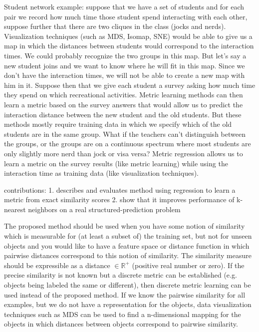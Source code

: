 \documentclass[a4paper,titlepage]{article}
\begin{document}


Student network example: suppose that we have a set of students and for each pair we record how much time those student spend interacting with each other, suppose further that there are two cliques in the class (jocks and nerds). Visualization techniques (such as MDS, Isomap, SNE) would be able to give us a map in which the distances between students would correspond to the interaction times. We could probably recognize the two groups in this map. But let's say a new student joins and we want to know where he will fit in this map. Since we don't have the interaction times, we will not be able to create a new map with him in it. Suppose then that we give each student a survey asking how much time they spend on which recreational activities. Metric learning methods can then learn a metric based on the survey answers that would allow us to predict the interaction distance between the new student and the old students. But these methods mostly require training data in which we specify which of the old students are in the same group. What if the teachers can't distinguish between the groups, or the groups are on a continuous spectrum where most students are only slightly more nerd than jock or visa versa? Metric regression allows us to learn a metric on the survey results (like metric learning) while using the interaction time as training data (like visualization techniques).

contributions: 
1. describes and evaluates method using regression to learn a metric from exact similarity scores 
2. show that it improves performance of k-nearest neighbors on a real structured-prediction problem

The proposed method should be used when you have some notion of similarity which is measurable for (at least a subset of) the training set, but not for unseen objects and you would like to have a feature space or distance function in which pairwise distances correspond to this notion of similarity. The similarity measure should be expressible as a distance $\in \mathbb{R}^{+}$ (positive real number or zero). If the precise similarity is not known but a discrete metric can be established (e.g. objects being labeled the same or different), then discrete metric learning can be used instead of the proposed method. If we know the pairwise similarity for all examples, but we do not have a representation for the objects, data visualization techniques such as \ac{MDS} can be used to find a n-dimensional mapping for the objects in which distances between objects correspond to pairwise similarity.
\end{document}
